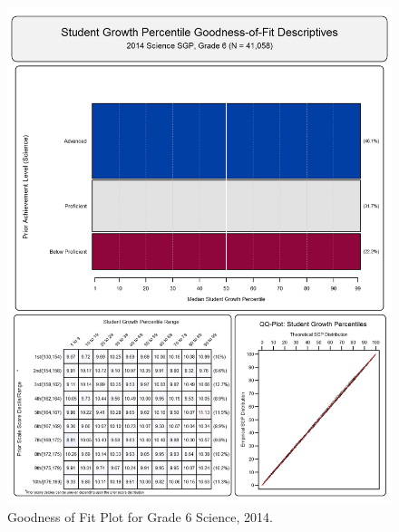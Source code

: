 \documentclass[12pt]{article}
\begin{document}
\begin{figure}[htbp]
\centering
\includegraphics{../img/Goodness_of_Fit/SCIENCE.2014/2014_SCIENCE_6;2013_SCIENCE_5;2012_SCIENCE_4.png}
\caption{Goodness of Fit Plot for Grade 6 Science, 2014.}
\end{figure}
\end{document}
